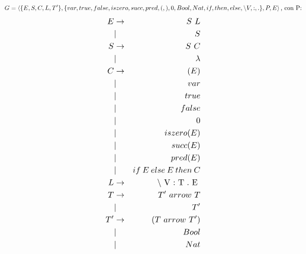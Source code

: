 \documentclass[spanish, a4paper]{article}
\begin{document}
$$G = \left<  \{E,S, C, L, T'\}, \{var, true, false, iszero, succ, pred, (, ), 0, Bool, Nat, if, then, else,  \textnormal{\textbackslash} V, :, . \}, P, E  \right> \textnormal{, con P:} $$
\begin{eqnarray}
  E & \rightarrow  & S\ L \nonumber \\
    & |            & S  \nonumber \\
  S & \rightarrow  & S\ C \nonumber \\
    & |            & \lambda  \nonumber\\
  C & \rightarrow & (E)  \nonumber\\
    & |           & var  \nonumber\\
    & |           & true  \nonumber\\
    & |           & false  \nonumber\\
    & |           & 0 \nonumber \\
    & |           & iszero(E)  \nonumber\\
    & |           & succ(E)  \nonumber\\
    & |           & pred(E)  \nonumber\\
    & |           & if \: E \: else \: E \: then \: C  \nonumber\\
    L & \rightarrow &  \textnormal{\textbackslash\ V :\ T .\ E } \nonumber\\
  T & \rightarrow & T'\ arrow\ T  \nonumber\\
     & |           & T'  \nonumber\\
  T' & \rightarrow & (T\ arrow\ T')  \nonumber\\
    & |           & Bool  \nonumber\\
     & |           & Nat  \nonumber\\
\end{eqnarray}
\end{document}
